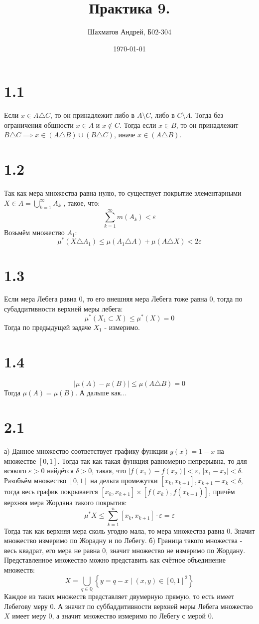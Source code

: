 \documentclass[12pt]{article}
\title{Практика 9.}
\author{Шахматов Андрей, Б02-304}
\date{\today}
\begin{document}
\maketitle
\tableofcontents

\section{1.1}
Если $x \in A \triangle C$, то он принадлежит либо в $A \setminus C$, либо в $C \setminus A$. Тогда без ограничения общности 
$x \in A$ и $x \not \in C$. Тогда если $x \in B$, то он принадлежит $B \triangle C \implies x \in (A \triangle B) \cup (B \triangle C)$, иначе 
$x \in (A \triangle B)$.    
\section{1.2}
Так как мера множества равна нулю, то существует покрытие элементарными $X \in A = \bigcup_{k=1}^{\infty} A_k$ , такое, что: 
\[
    \sum_{k=1}^{\infty} m(A_k) < \varepsilon
\]  
Возьмём множество $A_1$: 
\[
    \mu^{\ast}(X \triangle A_1) \leq \mu(A_1 \triangle A) + \mu(A \triangle X) < 2\varepsilon 
\]
\section{1.3}
Если мера Лебега равна $0$, то его внешняя мера Лебега тоже равна $0$, 
тогда по субаддитивности верхней меры лебега: 
\[
    \mu^{\ast}(X_1 \subset X) \leq \mu^{\ast}(X) = 0
\]   
Тогда по предыдущей задаче $X_1$ - измеримо. 
\section{1.4}
\[
    \left\vert \mu(A) - \mu(B) \right\vert \leq \mu (A \triangle B) = 0
\]
Тогда $\mu(A) = \mu(B)$. А дальше как... 
\section{2.1}
а) Данное множество соответствует графику функции $y(x) = 1 - x$ на множестве $[0, 1]$. 
Тогда так как такая функция равномерно непрерывна, то для всякого $\varepsilon > 0$ найдётся $\delta > 0$, 
такая, что $\vert f(x_1) - f(x_2) \vert < \varepsilon, \, \vert x_1 - x_2 \vert  < \delta$. Разобъём 
множество $[0, 1]$ на дельта промежутки $[x_k, x_{k+1}], x_{k+1} - x_k < \delta$, 
тогда весь график покрывается $[x_k, x_{k+1}] \times [f(x_k), f(x_{k+1})]$, причём верхняя мера Жордана 
такого покрытия:
\[
    \mu^{\ast} X \leq \sum_{k=1}^{n} [x_k, x_{k+1}] \cdot \varepsilon = \varepsilon  
\]     
Тогда так как верхняя мера сколь угодно мала, то мера множества равна $0$. Значит множество 
измеримо по Жорадну и по Лебегу. 
б) Граница такого множества - весь квадрат, его мера не равна 0, значит множество не измеримо по Жордану. 
Представленное множество можно представить как счётное объединение множеств: 
\[
    X = \bigcup_{q \in \mathbb{Q}} \left\{ y = q - x \mid (x, y) \in [0, 1]^2 \right\}  
\]
Каждое из таких множеств представляет двумерную прямую, то есть имеет Лебегову меру $0$. А значит 
по суббаддитивности верхней меры Лебега множество $X$ имеет меру $0$, а значит множество измеримо по Лебегу 
с мерой $0$.
\end{document}
